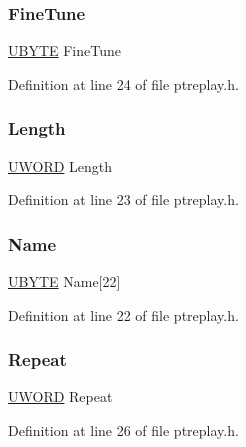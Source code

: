 \subsubsection{\texorpdfstring{FineTune}{FineTune}}
{\footnotesize\ttfamily \mbox{\hyperlink{utils_8h_a122c4acf389c050379f00341fdcd5812}{U\+B\+Y\+TE}} Fine\+Tune}



Definition at line 24 of file ptreplay.\+h.

\mbox{\label{struct_p_t_sample_a6e5423b9f55b8837d3f507785bc4a5d1}} 
\subsubsection{\texorpdfstring{Length}{Length}}
{\footnotesize\ttfamily \mbox{\hyperlink{utils_8h_aefbb6ca39ebcf009709e607d159766d5}{U\+W\+O\+RD}} Length}



Definition at line 23 of file ptreplay.\+h.

\mbox{\label{struct_p_t_sample_a2930d43823ce0cfa3e09afab221cf07c}} 
\subsubsection{\texorpdfstring{Name}{Name}}
{\footnotesize\ttfamily \mbox{\hyperlink{utils_8h_a122c4acf389c050379f00341fdcd5812}{U\+B\+Y\+TE}} Name\mbox{[}22\mbox{]}}



Definition at line 22 of file ptreplay.\+h.

\mbox{\label{struct_p_t_sample_a6ac10154fdd34624e96ff77b540f598e}} 
\subsubsection{\texorpdfstring{Repeat}{Repeat}}
{\footnotesize\ttfamily \mbox{\hyperlink{utils_8h_aefbb6ca39ebcf009709e607d159766d5}{U\+W\+O\+RD}} Repeat}



Definition at line 26 of file ptreplay.\+h.

